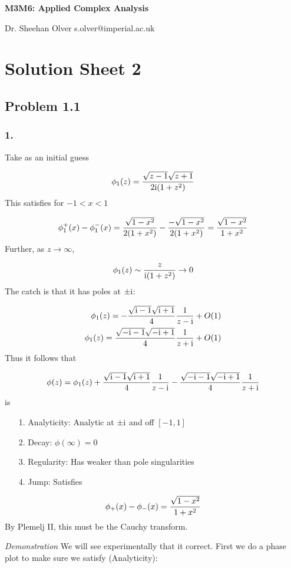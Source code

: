 \documentclass[12pt,a4paper]{article}
\def\I{ {\rm i} }
\begin{document}
\textbf{M3M6: Applied Complex Analysis}

Dr. Sheehan Olver s.olver@imperial.ac.uk

\section{Solution Sheet 2}
\subsection{Problem 1.1}
\subsubsection{1.}
Take as an initial guess

\[
 \phi_1(z) = {\sqrt{z-1} \sqrt{z+1}  \over 2\I(1 + z^2)}
\]
This satisfies for $-1 < x < 1$

\[
\phi_1^+(x) -\phi_1^-(x) = { \sqrt{1-x^2}  \over 2(1 + x^2)} -  {- \sqrt{1-x^2}  \over 2(1 + x^2)} = {\sqrt{1 - x^2} \over 1+x^2}
\]
Further, as $z \rightarrow \infty$, 

\[
\phi_1(z) \sim {z \over \I(1+ z^2)} \rightarrow 0
\]
The catch is that it has poles at $\pm \I$:


\begin{align*}
    \phi_1(z) = -{\sqrt{\I -1} \sqrt{\I+1} \over 4} { 1 \over z - \I} + O(1)  \\
    \phi_1(z) = {\sqrt{-\I -1} \sqrt{-\I+1} \over 4} { 1 \over z + \I} + O(1)     
\end{align*}
Thus it follows that

\[
\phi(z) =  \phi_1(z) + {\sqrt{\I -1} \sqrt{\I+1} \over 4} { 1 \over z - \I} - {\sqrt{-\I -1} \sqrt{-\I+1} \over 4} { 1 \over z + \I}
\]
is 

\begin{itemize}
\item[1. ] Analyticity: Analytic at $\pm \I$ and off $[-1,1]$


\item[2. ] Decay: $\phi(\infty) = 0$


\item[3. ] Regularity: Has weaker than pole singularities


\item[4. ] Jump: Satisfies

\end{itemize}
\[
\phi_+(x) - \phi_-(x) = {\sqrt{1-x^2} \over 1+x^2}
\]
By Plemelj II, this must be the Cauchy transform.

\emph{Demonstration} We will see experimentally that it correct. First we do a phase plot to make sure we satisfy (Analyticity):
\end{document}
